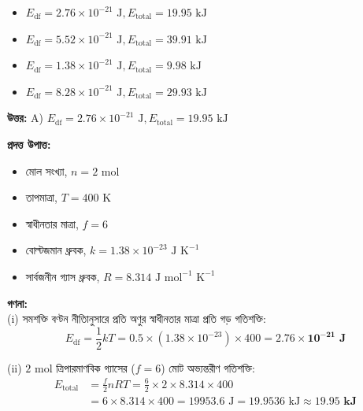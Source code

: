 \documentclass[12pt, a4paper]{article}
\begin{document}
\begin{itemize}[label={}, leftmargin=1cm, itemsep=0.5em]
    \item[\textbf{A)}] $E_{\text{df}} = 2.76 \times 10^{-21}\text{ J}, E_{\text{total}} = 19.95\text{ kJ}$
    \item[\textbf{B)}] $E_{\text{df}} = 5.52 \times 10^{-21}\text{ J}, E_{\text{total}} = 39.91\text{ kJ}$
    \item[\textbf{C)}] $E_{\text{df}} = 1.38 \times 10^{-21}\text{ J}, E_{\text{total}} = 9.98\text{ kJ}$
    \item[\textbf{D)}] $E_{\text{df}} = 8.28 \times 10^{-21}\text{ J}, E_{\text{total}} = 29.93\text{ kJ}$
\end{itemize}

\vspace{0.5em}
\begin{tcolorbox}[answerbox]
    \textbf{\color{success} উত্তর:} A) $E_{\text{df}} = 2.76 \times 10^{-21}\text{ J}, E_{\text{total}} = 19.95\text{ kJ}$
\end{tcolorbox}
\vspace{1em}

\begin{tcolorbox}[solutionbox={সমাধান (Solution)}]
    \noindent
    \textbf{প্রদত্ত উপাত্ত:}
    \begin{itemize}[leftmargin=1.5em, itemsep=0.2em]
        \item মোল সংখ্যা, $n = 2\text{ mol}$
        \item তাপমাত্রা, $T = 400\text{ K}$
        \item স্বাধীনতার মাত্রা, $f = 6$
        \item বোল্টজমান ধ্রুবক, $k = 1.38 \times 10^{-23}\text{ J K}^{-1}$
        \item সার্বজনীন গ্যাস ধ্রুবক, $R = 8.314\text{ J mol}^{-1}\text{ K}^{-1}$
    \end{itemize}

    \vspace{0.6em}
    \noindent\textbf{গণনা:} \\
    (i) সমশক্তি বণ্টন নীতিানুসারে প্রতি অণুর স্বাধীনতার মাত্রা প্রতি গড় গতিশক্তি:
    \[ E_{\text{df}} = \frac{1}{2} k T = 0.5 \times (1.38 \times 10^{-23}) \times 400 = \mathbf{2.76 \times 10^{-21}\text{ J}} \]
    
    (ii) $2\text{ mol}$ ত্রিপারমাণবিক গ্যাসের ($f = 6$) মোট অভ্যন্তরীণ গতিশক্তি:
    \begin{align*}
        E_{\text{total}} &= \frac{f}{2} n R T = \frac{6}{2} \times 2 \times 8.314 \times 400 \\
        &= 6 \times 8.314 \times 400 = 19953.6\text{ J} = 19.9536\text{ kJ} \approx \mathbf{19.95\text{ kJ}}
    \end{align*}
\end{tcolorbox}
\end{document}
